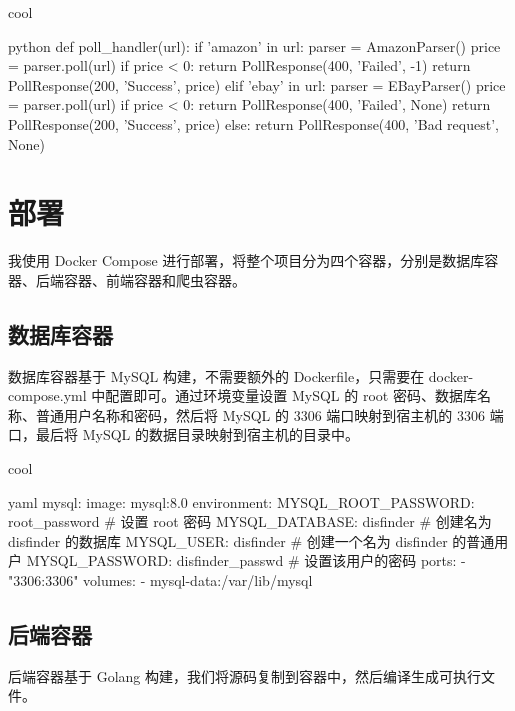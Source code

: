 \begin{codebox}{}{cool}
\begin{amzcode}{python}
def poll_handler(url):
    if 'amazon' in url:
        parser = AmazonParser()
        price = parser.poll(url)
        if price < 0:
            return PollResponse(400, 'Failed', -1)
        return PollResponse(200, 'Success', price)
    elif 'ebay' in url:
        parser = EBayParser()
        price = parser.poll(url)
        if price < 0:
            return PollResponse(400, 'Failed', None)
        return PollResponse(200, 'Success', price)
    else:
        return PollResponse(400, 'Bad request', None)
\end{amzcode}
\end{codebox}

\chapter{部署}

我使用 Docker Compose 进行部署，将整个项目分为四个容器，分别是数据库容器、后端容器、前端容器和爬虫容器。

\section{数据库容器}

数据库容器基于 MySQL 构建，不需要额外的 Dockerfile，只需要在 docker-compose.yml 中配置即可。通过环境变量设置 MySQL 的 root 密码、数据库名称、普通用户名称和密码，然后将 MySQL 的 3306 端口映射到宿主机的 3306 端口，最后将 MySQL 的数据目录映射到宿主机的目录中。

\begin{codebox}{}{cool}
\begin{amzcode}{yaml}
  mysql:
    image: mysql:8.0
    environment:
      MYSQL_ROOT_PASSWORD: root_password # 设置 root 密码
      MYSQL_DATABASE: disfinder # 创建名为 disfinder 的数据库
      MYSQL_USER: disfinder # 创建一个名为 disfinder 的普通用户
      MYSQL_PASSWORD: disfinder_passwd # 设置该用户的密码
    ports:
      - "3306:3306"
    volumes:
      - mysql-data:/var/lib/mysql
\end{amzcode}
\end{codebox}

\section{后端容器}

后端容器基于 Golang 构建，我们将源码复制到容器中，然后编译生成可执行文件。

